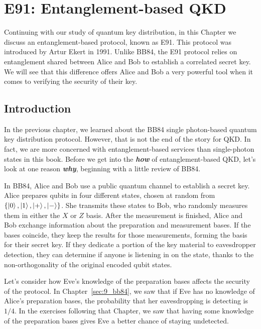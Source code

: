 \chapter{E91: Entanglement-based QKD}
\label{sec:10_E91}

Continuing with our study of quantum key distribution, in this Chapter we discuss an entanglement-based protocol, known as E91.
This protocol was introduced by Artur Ekert in 1991.
Unlike BB84, the E91 protocol relies on entanglement shared between Alice and Bob to establish a correlated secret key.
We will see that this difference offers Alice and Bob a very powerful tool when it comes to verifying the security of their key.



\section{Introduction}
\label{sec:E91-introduction}

In the previous chapter, we learned about the BB84 single photon-based quantum key distribution protocol.
However, that is not the end of the story for QKD.
In fact, we are more concerned with entanglement-based services than single-photon states in this book.
Before we get into the \textbf{\emph{how}} of entanglement-based QKD, let's look at one reason \textbf{\emph{why}}, beginning with a little review of BB84.

In BB84, Alice and Bob use a public quantum channel to establish a secret key.
Alice prepares qubits in four different states, chosen at random from $\{\left| 0 \right\rangle, \left| 1 \right\rangle, \left| + \right\rangle, \left| - \right\rangle\}$.
She transmits these states to Bob, who randomly measures them in either the $X$ or $Z$ basis.
After the measurement is finished, Alice and Bob exchange information about the preparation and measurement bases.
If the bases coincide, they keep the results for those measurements, forming the basis for their secret key.
If they dedicate a portion of the key material to eavesdropper detection, they can determine if anyone is listening in on the state, thanks to the non-orthogonality of the original encoded qubit states.

Let's consider how Eve's knowledge of the preparation bases affects the security of the protocol.
In Chapter~\ref{sec:9_bb84}, we saw that if Eve has no knowledge of Alice's preparation bases, the probability that her eavesdropping is detecting is $1/4$.
In the exercises following that Chapter, we saw that having some knowledge of the preparation bases gives Eve a better chance of staying undetected.

